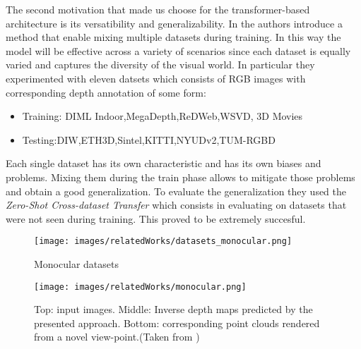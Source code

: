 The second motivation that made us choose for the transformer-based architecture is its versatibility and generalizability.
In \cite{Ranftl2022} the authors introduce a method that enable mixing multiple datasets during training. In this way the model will be 
effective across a variety of scenarios since each dataset is equally varied and captures the diversity of the visual world.
In particular they experimented with eleven datsets which consists of RGB images with corresponding depth annotation of some form:
\begin{itemize}
    \item Training: DIML Indoor,MegaDepth,ReDWeb,WSVD, 3D Movies
    \item Testing:DIW,ETH3D,Sintel,KITTI,NYUDv2,TUM-RGBD
\end{itemize}
Each single dataset has its own characteristic and has its own biases and problems. Mixing them during the train phase allows to mitigate
those problems and obtain a good generalization. To evaluate the generalization they used the \textit{Zero-Shot Cross-dataset Transfer} which
consists in evaluating on datasets that were not seen during training. This proved to be extremely succesful.


\begin{figure}
    \centering
    \texttt{[image: images/relatedWorks/datasets\_monocular.png]} 
    \caption{Monocular datasets}\label{fig:datasets_mono}
\end{figure}
\begin{figure}
    \centering
    \texttt{[image: images/relatedWorks/monocular.png]} 
    \caption{Top: input images. Middle: Inverse depth maps predicted by the presented approach. Bottom: corresponding point clouds
        rendered from a novel view-point.(Taken from \cite{Ranftl2022})}\label{fig:mono}
\end{figure}

